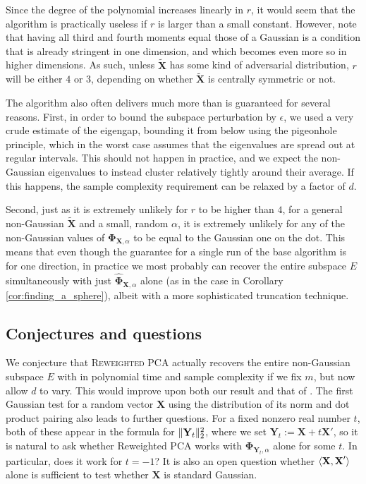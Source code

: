 \documentclass[final,12pt]{colt2018} %
\numberwithin{equation}{section}
\DeclarePairedDelimiter{\norm}{\lVert}{\rVert}
\DeclarePairedDelimiter{\inprod}{\langle}{\rangle}
\newcommand{\boldPhi}{\boldsymbol{\Phi}}
\newcommand{\boldX}{\textbf{X}}
\newcommand{\boldY}{\textbf{Y}}
\begin{document}
Since the degree of the polynomial increases linearly in $r$, it would seem that the algorithm is practically useless if $r$ is larger than a small constant. However, note that having all third and fourth moments equal those of a Gaussian is a condition that is already stringent in one dimension, and which becomes even more so in higher dimensions. As such, unless $\tilde{\boldX}$ has some kind of adversarial distribution, $r$ will be either $4$ or $3$, depending on whether $\tilde{\boldX}$ is centrally symmetric or not.

The algorithm also often delivers much more than is guaranteed for several reasons. First, in order to bound the subspace perturbation by $\epsilon$, we used a very crude estimate of the eigengap, bounding it from below using the pigeonhole principle, which in the worst case assumes that the eigenvalues are spread out at regular intervals. This should not happen in practice, and we expect the non-Gaussian eigenvalues to instead cluster relatively tightly around their average. If this happens, the sample complexity requirement can be relaxed by a factor of $d$.

Second, just as it is extremely unlikely for $r$ to be higher than $4$, for a general non-Gaussian $\tilde{\boldX}$ and a small, random $\alpha$, it is extremely unlikely for any of the non-Gaussian values of $\boldPhi_{\boldX,\alpha}$ to be equal to the Gaussian one on the dot. This means that even though the guarantee for a single run of the base algorithm is for one direction, in practice we most probably can recover the entire subspace $E$ simultaneously with just $\hat{\boldPhi}_{\boldX,\alpha}$ alone (as in the case in Corollary \ref{cor:finding_a_sphere}), albeit with a more sophisticated truncation technique.

\subsection{Conjectures and questions}

We conjecture that \textsc{Reweighted PCA} actually recovers the entire non-Gaussian subspace $E$ with in polynomial time and sample complexity if we fix $m$, but now allow $d$ to vary. This would improve upon both our result and that of \cite{Vempala2011}. The first Gaussian test for a random vector $\boldX$ using the distribution of its norm and dot product pairing also leads to further questions. For a fixed nonzero real number $t$, both of these appear in the formula for $\norm{\boldY_t}_2^2$, where we set $\boldY_t := \boldX+t\boldX'$, so it is natural to ask whether Reweighted PCA works with $\boldPhi_{\boldY_t,\alpha}$ alone for some $t$. In particular, does it work for $t=-1$? It is also an open question whether $\inprod{\boldX,\boldX'}$ alone is sufficient to test whether $\boldX$ is standard Gaussian.
\end{document}
